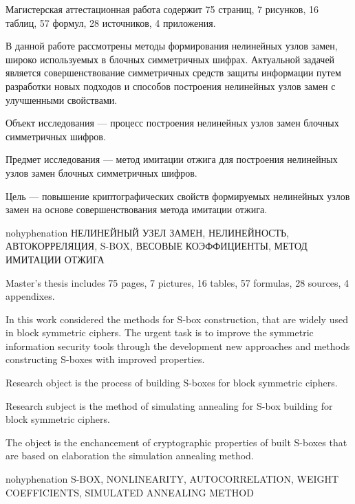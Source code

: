 
Магистерская аттестационная работа содержит 75 страниц, 7 рисунков, 16 таблиц,
57 формул, 28 источников, 4 приложения.

В данной работе рассмотрены методы формирования нелинейных узлов замен, широко
используемых в блочных симметричных шифрах. Актуальной задачей является
совершенствование симметричных средств защиты информации путем разработки новых
подходов и способов построения нелинейных узлов замен с улучшенными свойствами.

Объект исследования --- процесс построения нелинейных узлов замен блочных
симметричных шифров.

Предмет исследования --- метод имитации отжига для построения нелинейных узлов
замен блочных симметричных шифров.

Цель --- повышение криптографических свойств формируемых нелинейных узлов замен
на основе совершенствования метода имитации отжига.

\bigskip\bigskip

\begin{hyphenrules}{nohyphenation}
НЕЛИНЕЙНЫЙ УЗЕЛ ЗАМЕН, НЕЛИНЕЙНОСТЬ, АВТОКОРРЕЛЯЦИЯ, S-BOX, ВЕСОВЫЕ
КОЭФФИЦИЕНТЫ, МЕТОД ИМИТАЦИИ ОТЖИГА
\end{hyphenrules}


Master's thesis includes 75 pages, 7 pictures, 16 tables, 57 formulas,
28 sources, 4 appendixes.

In this work considered the methods for S-box construction, that are widely used
in block symmetric ciphers. The urgent task is to improve the symmetric
information security tools through the development new approaches and methods
constructing S-boxes with improved properties.

Research object is the process of building S-boxes for block symmetric ciphers.

Research subject is the method of simulating annealing for S-box building for
block symmetric ciphers.

The object is the enchancement of cryptographic properties of built S-boxes that
are based on elaboration the simulation annealing method.

\bigskip\bigskip

\begin{hyphenrules}{nohyphenation}
S-BOX, NONLINEARITY, AUTOCORRELATION, WEIGHT COEFFICIENTS, SIMULATED ANNEALING
METHOD
\end{hyphenrules}

